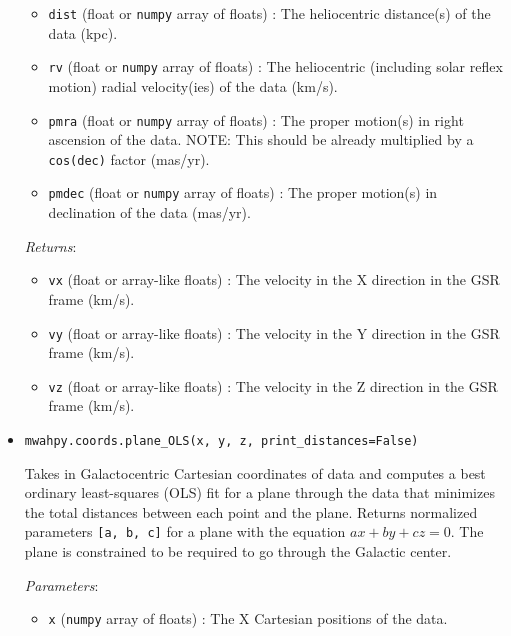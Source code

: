 \documentclass{article}
\begin{document}
\begin{itemize}
\begin{itemize}
\item \verb!dist! (float or \verb!numpy! array of floats) : The heliocentric distance(s) of the data (kpc).

\item \verb!rv! (float or \verb!numpy! array of floats) : The heliocentric (including solar reflex motion) radial velocity(ies) of the data (km/s).

\item \verb!pmra! (float or \verb!numpy! array of floats) : The proper motion(s) in right ascension of the data. NOTE: This should be already multiplied by a \verb!cos(dec)! factor (mas/yr). 

\item \verb!pmdec! (float or \verb!numpy! array of floats) : The proper motion(s) in declination of the data (mas/yr).

\end{itemize}

\textit{Returns}: \begin{itemize}

\item \verb!vx! (float or array-like floats) : The velocity in the X direction in the GSR frame (km/s).

\item \verb!vy! (float or array-like floats) : The velocity in the Y direction in the GSR frame (km/s).

\item \verb!vz! (float or array-like floats) : The velocity in the Z direction in the GSR frame (km/s).

\end{itemize}



\item \verb!mwahpy.coords.plane_OLS(x, y, z, print_distances=False)!

Takes in Galactocentric Cartesian coordinates of data and computes a best ordinary least-squares (OLS) fit for a plane through the data that minimizes the total distances between each point and the plane. Returns normalized parameters \verb![a, b, c]! for a plane with the equation $ax + by + cz = 0$. The plane is constrained to be required to go through the Galactic center.

\textit{Parameters}: \begin{itemize}

\item \verb!x! (\verb!numpy! array of floats) : The X Cartesian positions of the data.


\end{itemize}
\end{itemize}
\end{document}
